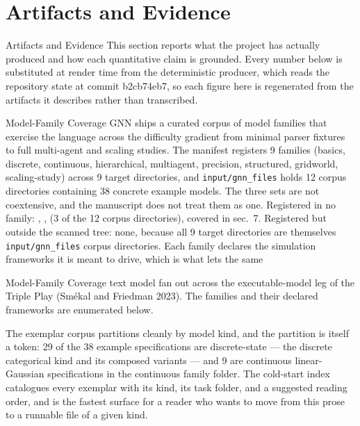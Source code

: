 \documentclass[
  ignorenonframetext,
]{beamer}
\author{\texorpdfstring{}{}}
\date{}
\newcounter{none} %
\begin{document}
\section{Artifacts and Evidence}\label{sec:artifacts_evidence}

\begin{frame}[allowframebreaks]{Artifacts and Evidence}
This section reports what the project has actually produced and how each
quantitative claim is grounded. Every number below is substituted at
render time from the deterministic producer, which reads the repository
state at commit b2cb74eb7, so each figure here is regenerated from the
artifacts it describes rather than transcribed.
\end{frame}

\begin{frame}{Model-Family Coverage}
\protect{}\label{model-family-coverage}
GNN ships a curated corpus of model families that exercise the language
across the difficulty gradient from minimal parser fixtures to full
multi-agent and scaling studies. The manifest registers 9 families
(basics, discrete, continuous, hierarchical, multiagent, precision,
structured, gridworld, scaling-study) across 9 target directories, and
\texttt{input/gnn\_files} holds 12 corpus directories containing 38
concrete example models. The three sets are not coextensive, and the
manuscript does not treat them as one. Registered in no family:
, ,
 (3 of the 12 corpus directories),
covered in sec.~7. Registered but outside
the scanned tree: none, because all 9 target directories are themselves
\texttt{input/gnn\_files} corpus directories. Each family declares the
simulation frameworks it is meant to drive, which is what lets the same
\end{frame}

\begin{frame}{Model-Family Coverage}
text model fan out across the executable-model leg of the Triple Play
(Smékal and Friedman 2023). The families and their declared frameworks
are enumerated below.

The exemplar corpus partitions cleanly by model kind, and the partition
is itself a token: 29 of the 38 example specifications are
discrete-state --- the discrete categorical kind and its composed
variants --- and 9 are continuous linear-Gaussian specifications in the
continuous family folder. The cold-start index
 catalogues every exemplar with its
kind, its task folder, and a suggested reading order, and is the fastest
surface for a reader who wants to move from this prose to a runnable
file of a given kind.

\end{frame}
\end{document}
